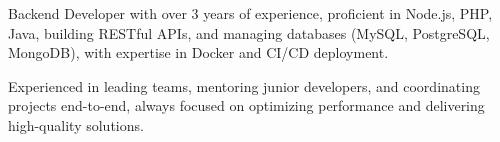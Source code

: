 

\begin{cvparagraph}

Backend Developer with over 3 years of experience, proficient in Node.js, PHP, Java, building RESTful APIs, and managing databases (MySQL, PostgreSQL, MongoDB), with expertise in Docker and CI/CD deployment.

Experienced in leading teams, mentoring junior developers, and coordinating projects end-to-end, always focused on optimizing performance and delivering high-quality solutions.
\end{cvparagraph}
